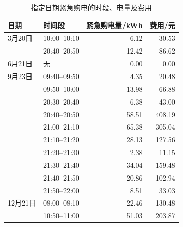 \begin{table}[H]
\centering
\caption{指定日期紧急购电的时段、电量及费用}
\label{tab:q3_emergency}
\small
\setlength{\tabcolsep}{5pt}
\begin{tabular}{llrr}
\toprule
日期 & 时间段 & 紧急购电量/kWh & 费用/元 \\
\midrule
3月20日 & 10:00--10:10 & 6.12 & 30.53 \\
 & 20:40--20:50 & 12.42 & 86.62 \\
6月21日 & 无 & 0.00 & 0.00 \\
9月23日 & 09:40--09:50 & 4.35 & 20.48 \\
 & 09:50--10:00 & 13.98 & 66.88 \\
 & 20:30--20:40 & 6.38 & 43.00 \\
 & 20:40--20:50 & 58.51 & 408.19 \\
 & 21:00--21:10 & 65.38 & 305.04 \\
 & 21:10--21:20 & 28.13 & 127.56 \\
 & 21:20--21:30 & 2.38 & 11.15 \\
 & 21:30--21:40 & 34.04 & 159.48 \\
 & 21:40--21:50 & 20.86 & 102.94 \\
 & 21:50--22:00 & 8.51 & 33.03 \\
12月21日 & 08:00--08:10 & 22.46 & 130.48 \\
 & 10:50--11:00 & 51.03 & 203.87 \\
\bottomrule
\end{tabular}
\end{table}
